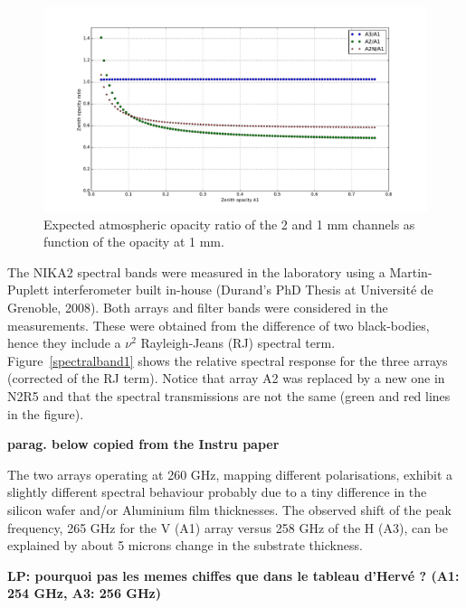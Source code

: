 \begin{figure}[ht] %
\begin{center}
\includegraphics[width=\textwidth]{Figures/SpectralBands/opacity_ratio_vs_tau1.pdf}
\caption{Expected atmospheric opacity ratio of the 2 and 1 mm channels as function of the opacity at 1 mm. \label{thopacities}}
\end{center}
\end{figure}



The NIKA2 spectral bands were measured in the laboratory using a
Martin-Puplett interferometer built in-house (Durand's PhD Thesis at
Universit\'e de Grenoble, 2008).
Both arrays and filter bands were considered in the
measurements. These were obtained from the difference of two
black-bodies, hence they include a $\nu^2$ Rayleigh-Jeans (RJ) spectral term.
Figure~\ref{spectralband1} shows the
relative spectral response for the three arrays (corrected of the RJ
term). Notice that array A2 was replaced by a new one in N2R5 and that
the spectral transmissions are not the same (green and red lines in the
figure).

{\bf parag. below copied from the Instru paper}

The two arrays operating at 260 GHz, mapping different polarisations, exhibit a slightly different
spectral behaviour probably due to a tiny difference in the
silicon wafer and/or Aluminium film thicknesses. The observed
shift of the peak frequency, 265 GHz for the V (A1) array versus
258 GHz of the H (A3), can be explained by about 5 microns
change in the substrate thickness.

{\bf LP: pourquoi pas les memes chiffes que dans le tableau d'Herv\'e ?
  (A1: 254 GHz, A3: 256 GHz)}



